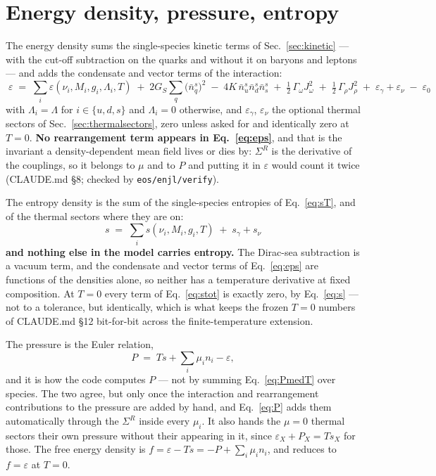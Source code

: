 \documentclass[aps,prc,onecolumn,superscriptaddress,nofootinbib,10pt]{revtex4-2}
\newcommand{\nbs}{\bar{n}^s}
\newcommand{\SR}{\Sigma^{R}}
\begin{document}
\section{Energy density, pressure, entropy}
\label{sec:assembly}

The energy density sums the single-species kinetic terms of
Sec.~\ref{sec:kinetic} --- with the cut-off subtraction on the quarks and
without it on baryons and leptons --- and adds the condensate and vector
terms of the interaction:
%
\begin{equation}
\boxed{\;
\varepsilon \;=\; \sum_i \varepsilon(\nu_i, M_i, g_i, \Lambda_i, T)
  \;+\; 2 G_S \sum_q \big(\nbs_q\big)^2
  \;-\; 4 K\, \nbs_u \nbs_d \nbs_s
  \;+\; \tfrac12\,\Gamma_\omega J_\omega^2
  \;+\; \tfrac12\,\Gamma_\rho   J_\rho^2
  \;+\; \varepsilon_\gamma + \varepsilon_\nu
  \;-\; \varepsilon_0 \;}
\label{eq:eps}
\end{equation}
%
with $\Lambda_i = \Lambda$ for $i \in \{u,d,s\}$ and $\Lambda_i = 0$
otherwise, and $\varepsilon_\gamma$, $\varepsilon_\nu$ the optional thermal
sectors of Sec.~\ref{sec:thermalsectors}, zero unless asked for and
identically zero at $T = 0$. \textbf{No rearrangement term appears in
Eq.~\eqref{eq:eps}}, and that is the invariant a density-dependent mean field
lives or dies by: $\SR$ is the derivative of the couplings, so it belongs to
$\mu$ and to $P$ and putting it in $\varepsilon$ would count it twice
(CLAUDE.md \S8; checked by \texttt{eos/enjl/verify}).

The entropy density is the sum of the single-species entropies of
Eq.~\eqref{eq:sT}, and of the thermal sectors where they are on:
%
\begin{equation}
\boxed{\; s \;=\; \sum_i s(\nu_i, M_i, g_i, T) \;+\; s_\gamma + s_\nu \;}
\label{eq:stot}
\end{equation}
%
\textbf{and nothing else in the model carries entropy.} The Dirac-sea
subtraction is a vacuum term, and the condensate and vector terms of
Eq.~\eqref{eq:eps} are functions of the densities alone, so neither has a
temperature derivative at fixed composition. At $T = 0$ every term of
Eq.~\eqref{eq:stot} is exactly zero, by Eq.~\eqref{eq:s} --- not to a
tolerance, but identically, which is what keeps the frozen $T = 0$ numbers of
CLAUDE.md \S12 bit-for-bit across the finite-temperature extension.

The pressure is the Euler relation,
%
\begin{equation}
P \;=\; T s + \sum_i \mu_i n_i - \varepsilon ,
\label{eq:P}
\end{equation}
%
and it is how the code computes $P$ --- not by summing Eq.~\eqref{eq:PmedT}
over species. The two agree, but only once the interaction and rearrangement
contributions to the pressure are added by hand, and Eq.~\eqref{eq:P} adds
them automatically through the $\SR$ inside every $\mu_i$. It also hands the
$\mu = 0$ thermal sectors their own pressure without their appearing in it,
since $\varepsilon_X + P_X = T s_X$ for those. The free energy density is
$f = \varepsilon - Ts = -P + \sum_i \mu_i n_i$, and reduces to
$f = \varepsilon$ at $T = 0$.
\end{document}
